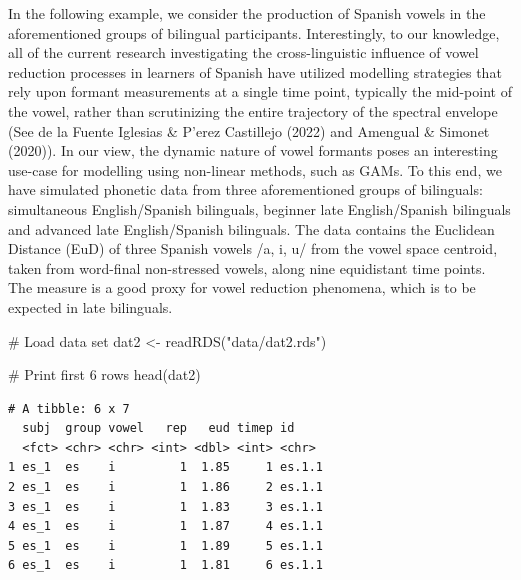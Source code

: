 \documentclass[
  letterpaper,
  DIV=11,
  numbers=noendperiod]{scrartcl}
\newenvironment{Shaded}{\begin{snugshade}}{\end{snugshade}}
\newcommand{\CommentTok}[1]{\textcolor[rgb]{0.37,0.37,0.37}{#1}}
\newcommand{\FunctionTok}[1]{\textcolor[rgb]{0.28,0.35,0.67}{#1}}
\newcommand{\NormalTok}[1]{\textcolor[rgb]{0.00,0.23,0.31}{#1}}
\newcommand{\OtherTok}[1]{\textcolor[rgb]{0.00,0.23,0.31}{#1}}
\newcommand{\StringTok}[1]{\textcolor[rgb]{0.13,0.47,0.30}{#1}}
\begin{document}
In the following example, we consider the production of Spanish vowels
in the aforementioned groups of bilingual participants. Interestingly,
to our knowledge, all of the current research investigating the
cross-linguistic influence of vowel reduction processes in learners of
Spanish have utilized modelling strategies that rely upon formant
measurements at a single time point, typically the mid-point of the
vowel, rather than scrutinizing the entire trajectory of the spectral
envelope (See de la Fuente Iglesias \& P'erez Castillejo (2022) and
Amengual \& Simonet (2020)). In our view, the dynamic nature of vowel
formants poses an interesting use-case for modelling using non-linear
methods, such as GAMs. To this end, we have simulated phonetic data from
three aforementioned groups of bilinguals: simultaneous English/Spanish
bilinguals, beginner late English/Spanish bilinguals and advanced late
English/Spanish bilinguals. The data contains the Euclidean Distance
(EuD) of three Spanish vowels /a, i, u/ from the vowel space centroid,
taken from word-final non-stressed vowels, along nine equidistant time
points. The measure is a good proxy for vowel reduction phenomena, which
is to be expected in late bilinguals.

\begin{Shaded}
\begin{Highlighting}[]
\CommentTok{\# Load data set}
\NormalTok{dat2 }\OtherTok{\textless{}{-}} \FunctionTok{readRDS}\NormalTok{(}\StringTok{"data/dat2.rds"}\NormalTok{)}

\CommentTok{\# Print first 6 rows}
\FunctionTok{head}\NormalTok{(dat2)}
\end{Highlighting}
\end{Shaded}

\begin{verbatim}
# A tibble: 6 x 7
  subj  group vowel   rep   eud timep id    
  <fct> <chr> <chr> <int> <dbl> <int> <chr> 
1 es_1  es    i         1  1.85     1 es.1.1
2 es_1  es    i         1  1.86     2 es.1.1
3 es_1  es    i         1  1.83     3 es.1.1
4 es_1  es    i         1  1.87     4 es.1.1
5 es_1  es    i         1  1.89     5 es.1.1
6 es_1  es    i         1  1.81     6 es.1.1
\end{verbatim}
\end{document}
